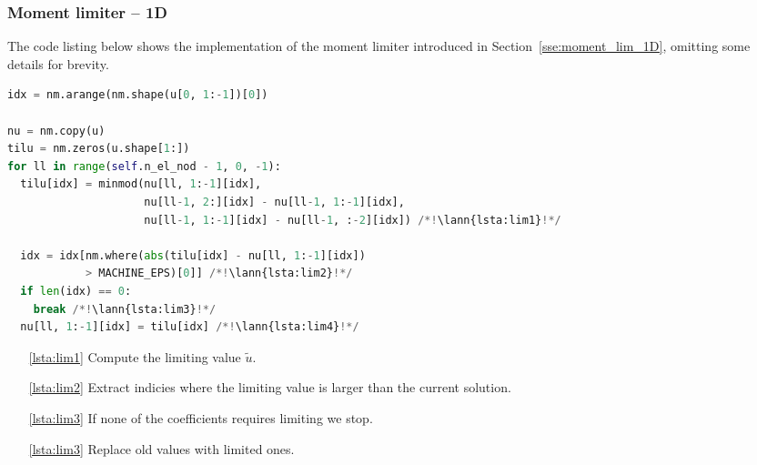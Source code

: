 \subsubsection{Moment limiter -- 1D}
\label{se:i_moment_lim_1D}
The code listing below shows the implementation of the moment limiter introduced in Section~\ref{sse:moment_lim_1D},
omitting some details for brevity.
\setcounter{lstannotation}{0}
\begin{lstlisting}[language=Python, caption=Moment limiter for 1D.]
idx = nm.arange(nm.shape(u[0, 1:-1])[0])

nu = nm.copy(u)
tilu = nm.zeros(u.shape[1:])
for ll in range(self.n_el_nod - 1, 0, -1):
  tilu[idx] = minmod(nu[ll, 1:-1][idx],
                     nu[ll-1, 2:][idx] - nu[ll-1, 1:-1][idx],
                     nu[ll-1, 1:-1][idx] - nu[ll-1, :-2][idx]) /*!\lann{lsta:lim1}!*/

  idx = idx[nm.where(abs(tilu[idx] - nu[ll, 1:-1][idx])
            > MACHINE_EPS)[0]] /*!\lann{lsta:lim2}!*/
  if len(idx) == 0:
    break /*!\lann{lsta:lim3}!*/
  nu[ll, 1:-1][idx] = tilu[idx] /*!\lann{lsta:lim4}!*/
\end{lstlisting}
\begin{itemize}
    \item [\ref{lsta:lim1}] Compute the limiting value $\tilde{u}$.
    \item [\ref{lsta:lim2}] Extract indicies where the limiting value is
    larger than the
    current solution.
    \item[\ref{lsta:lim3}] If none of the coefficients requires limiting we
    stop.
    \item [\ref{lsta:lim3}] Replace old values with limited ones.

\end{itemize}

